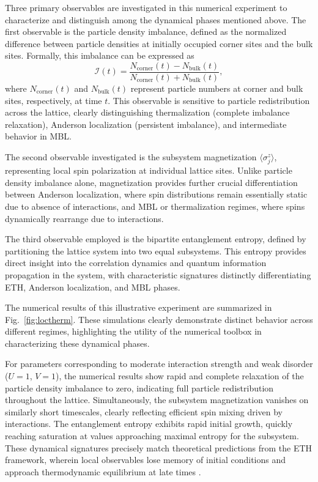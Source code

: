 Three primary observables are investigated in this numerical experiment to characterize and distinguish among the dynamical phases mentioned above. The first observable is the particle density imbalance, defined as the normalized difference between particle densities at initially occupied corner sites and the bulk sites. Formally, this imbalance can be expressed as
\begin{equation}
\mathcal{I}(t) = \frac{N_\text{corner}(t)-N_\text{bulk}(t)}{N_\text{corner}(t)+N_\text{bulk}(t)},
\end{equation}
where $N_\text{corner}(t)$ and $N_\text{bulk}(t)$ represent particle numbers at corner and bulk sites, respectively, at time $t$. This observable is sensitive to particle redistribution across the lattice, clearly distinguishing thermalization (complete imbalance relaxation), Anderson localization (persistent imbalance), and intermediate behavior in MBL.

The second observable investigated is the subsystem magnetization $\langle \sigma_j^z\rangle$, representing local spin polarization at individual lattice sites. Unlike particle density imbalance alone, magnetization provides further crucial differentiation between Anderson localization, where spin distributions remain essentially static due to absence of interactions, and MBL or thermalization regimes, where spins dynamically rearrange due to interactions.

The third observable employed is the bipartite entanglement entropy, defined by partitioning the lattice system into two equal subsystems. This entropy provides direct insight into the correlation dynamics and quantum information propagation in the system, with characteristic signatures distinctly differentiating ETH, Anderson localization, and MBL phases.

The numerical results of this illustrative experiment are summarized in Fig.~\ref{fig:loctherm}. These simulations clearly demonstrate distinct behavior across different regimes, highlighting the utility of the numerical toolbox in characterizing these dynamical phases.


For parameters corresponding to moderate interaction strength and weak disorder ($U=1$, $V=1$), the numerical results show rapid and complete relaxation of the particle density imbalance to zero, indicating full particle redistribution throughout the lattice. Simultaneously, the subsystem magnetization vanishes on similarly short timescales, clearly reflecting efficient spin mixing driven by interactions. The entanglement entropy exhibits rapid initial growth, quickly reaching saturation at values approaching maximal entropy for the subsystem. These dynamical signatures precisely match theoretical predictions from the ETH framework, wherein local observables lose memory of initial conditions and approach thermodynamic equilibrium at late times \cite{deutsch_quantum_1991,srednicki_chaos_1994}.

